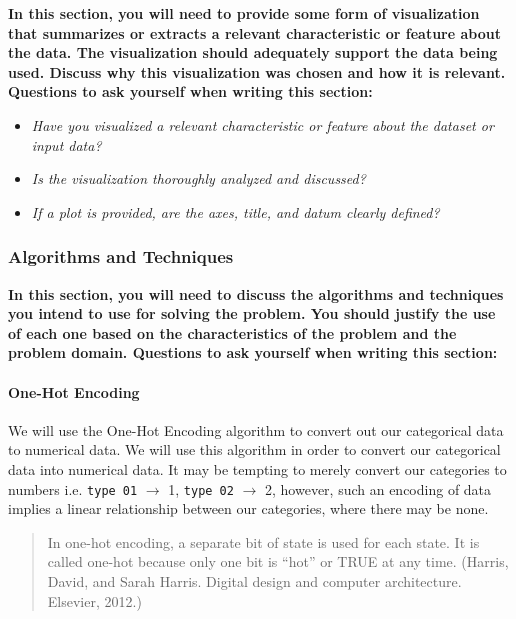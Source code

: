 \documentclass[]{report}
\begin{document}
\textbf{In this section, you will need to provide some form of
visualization that summarizes or extracts a relevant characteristic or
feature about the data. The visualization should adequately support the
data being used. Discuss why this visualization was chosen and how it is
relevant. Questions to ask yourself when writing this section:}

\begin{itemize}
\itemsep1pt\parskip0pt
\item
  \emph{Have you visualized a relevant characteristic or feature about
  the dataset or input data?}
\item
  \emph{Is the visualization thoroughly analyzed and discussed?}
\item
  \emph{If a plot is provided, are the axes, title, and datum clearly
  defined?}
\end{itemize}

\pagebreak

\subsubsection{Algorithms and
Techniques}\label{algorithms-and-techniques}

\textbf{In this section, you will need to discuss the algorithms and
techniques you intend to use for solving the problem. You should justify
the use of each one based on the characteristics of the problem and the
problem domain. Questions to ask yourself when writing this section:}

\paragraph{One-Hot Encoding}\label{one-hot-encoding}

We will use the One-Hot Encoding algorithm to convert out our
categorical data to numerical data. We will use this algorithm in order
to convert our categorical data into numerical data. It may be tempting
to merely convert our categories to numbers i.e. \texttt{type 01} $\to$
1, \texttt{type 02} $\to$ 2, however, such an encoding of data implies a
linear relationship between our categories, where there may be none.

\begin{quote}
In one-hot encoding, a separate bit of state is used for each state. It
is called one-hot because only one bit is ``hot'' or TRUE at any time.
(Harris, David, and Sarah Harris. Digital design and computer
architecture. Elsevier, 2012.)
\end{quote}
\end{document}
